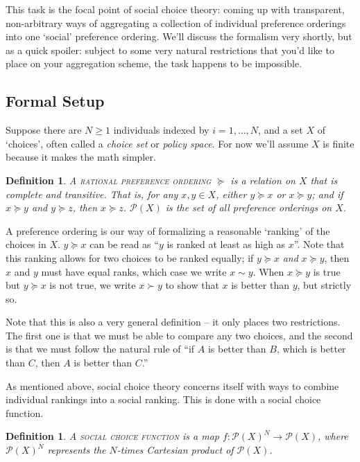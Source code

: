 \documentclass[12pt]{article}
\newtheorem{definition}[theorem]{Definition}
\theoremstyle{definition}
\theoremstyle{remark}
\theoremstyle{plain}                          %
\begin{document}
This task is the focal point of social choice theory: coming up with transparent, non-arbitrary ways of aggregating a collection of individual preference orderings into one `social' preference ordering. We'll discuss the formalism very shortly, but as a quick spoiler: subject to some very natural restrictions that you'd like to place on your aggregation scheme, the task happens to be impossible.
 
\subsection{Formal Setup}
 
Suppose there are $N \geq 1$ individuals indexed by $i=1,\dots,N$, and a set $X$ of `choices', often called a \textit{choice set} or \textit{policy space}. For now we'll assume $X$ is finite because it makes the math simpler.
 
\begin{definition}
    A \textsc{rational preference ordering} $\succeq$ is a relation on $X$ that is complete and transitive. That is, for any $x,y \in X$, either $y \succeq x$ or $x \succeq y$; and if $x \succeq y$ and $y \succeq z$, then $x \succeq z$. $\mathscr P(X)$ is the set of all preference orderings on $X$.
\end{definition}
 
 A preference ordering is our way of formalizing a reasonable `ranking' of the choices in $X$. $y \succeq x$ can be read as ``$y$ is ranked at least as high as $x$''. Note that this ranking allows for two choices to be ranked equally; if $y \succeq x$ \textit{and} $x \succeq y$, then $x$ and $y$ must have equal ranks, which case we write $x \sim y$. When $x \succeq y$ is true but $y \succeq x$ is not true, we write $x \succ y$ to show that $x$ is better than $y$, but strictly so.
 
 Note that this is also a very general definition -- it only places two restrictions. The first one is that we must be able to compare any two choices, and the second is that we must follow the natural rule of ``if $A$ is better than $B$, which is better than $C$, then $A$ is better than $C$.''
 
As mentioned above, social choice theory concerns itself with ways to combine individual rankings into a social ranking. This is done with a social choice function.
 
\begin{definition}
    A \textsc{social choice function} is a map $f:\mathscr P(X)^N \to \mathscr P(X)$, where $\mathscr P(X)^N$ represents the $N$-times Cartesian product of $\mathscr P(X)$.
\end{definition}
 
\end{document}
